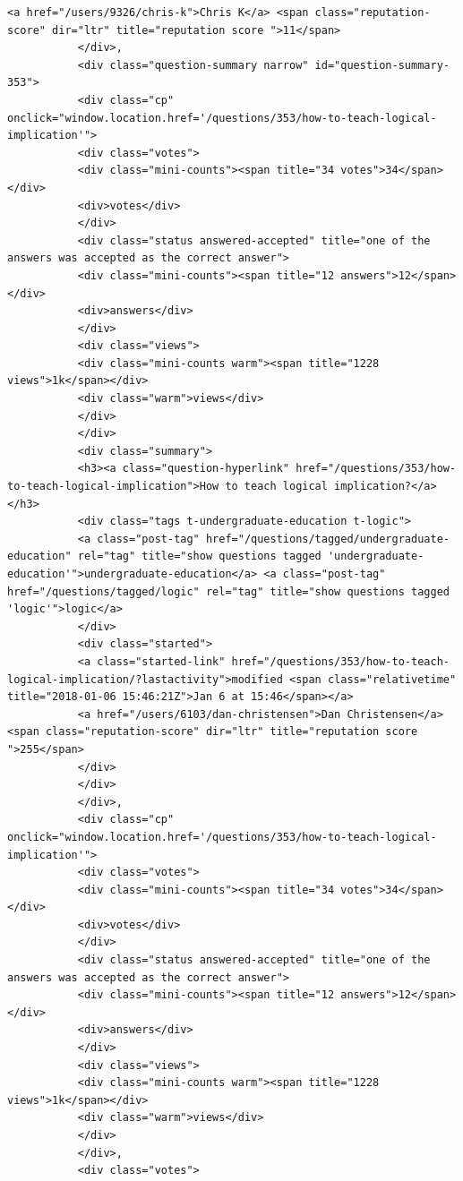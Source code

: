 \documentclass[11pt]{article}
\begin{document}
\begin{Verbatim}[commandchars=\\\{\}]
           <a href="/users/9326/chris-k">Chris K</a> <span class="reputation-score" dir="ltr" title="reputation score ">11</span>
           </div>,
           <div class="question-summary narrow" id="question-summary-353">
           <div class="cp" onclick="window.location.href='/questions/353/how-to-teach-logical-implication'">
           <div class="votes">
           <div class="mini-counts"><span title="34 votes">34</span></div>
           <div>votes</div>
           </div>
           <div class="status answered-accepted" title="one of the answers was accepted as the correct answer">
           <div class="mini-counts"><span title="12 answers">12</span></div>
           <div>answers</div>
           </div>
           <div class="views">
           <div class="mini-counts warm"><span title="1228 views">1k</span></div>
           <div class="warm">views</div>
           </div>
           </div>
           <div class="summary">
           <h3><a class="question-hyperlink" href="/questions/353/how-to-teach-logical-implication">How to teach logical implication?</a></h3>
           <div class="tags t-undergraduate-education t-logic">
           <a class="post-tag" href="/questions/tagged/undergraduate-education" rel="tag" title="show questions tagged 'undergraduate-education'">undergraduate-education</a> <a class="post-tag" href="/questions/tagged/logic" rel="tag" title="show questions tagged 'logic'">logic</a>
           </div>
           <div class="started">
           <a class="started-link" href="/questions/353/how-to-teach-logical-implication/?lastactivity">modified <span class="relativetime" title="2018-01-06 15:46:21Z">Jan 6 at 15:46</span></a>
           <a href="/users/6103/dan-christensen">Dan Christensen</a> <span class="reputation-score" dir="ltr" title="reputation score ">255</span>
           </div>
           </div>
           </div>,
           <div class="cp" onclick="window.location.href='/questions/353/how-to-teach-logical-implication'">
           <div class="votes">
           <div class="mini-counts"><span title="34 votes">34</span></div>
           <div>votes</div>
           </div>
           <div class="status answered-accepted" title="one of the answers was accepted as the correct answer">
           <div class="mini-counts"><span title="12 answers">12</span></div>
           <div>answers</div>
           </div>
           <div class="views">
           <div class="mini-counts warm"><span title="1228 views">1k</span></div>
           <div class="warm">views</div>
           </div>
           </div>,
           <div class="votes">

\end{Verbatim}
\end{document}
